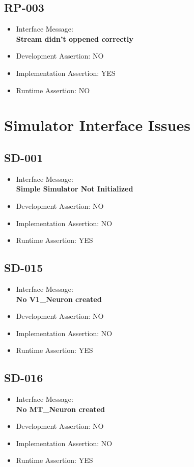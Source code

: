 \subsection{RP-003}
\begin{itemize}
  \item Interface Message:\\[1em]\textbf{Stream didn't oppened correctly}
  \item Development Assertion: NO
  \item Implementation Assertion: YES
  \item Runtime Assertion: NO
\end{itemize}

\section{Simulator Interface Issues}

\subsection{SD-001}
\begin{itemize}
  \item Interface Message:\\[1em]\textbf{Simple Simulator Not Initialized}
  \item Development Assertion: NO
  \item Implementation Assertion: NO
  \item Runtime Assertion: YES
\end{itemize}

\subsection{SD-015}
\begin{itemize}
  \item Interface Message:\\[1em]\textbf{No V1\_Neuron created}
  \item Development Assertion: NO
  \item Implementation Assertion: NO
  \item Runtime Assertion: YES
\end{itemize}

\subsection{SD-016}
\begin{itemize}
  \item Interface Message:\\[1em]\textbf{No MT\_Neuron created}
  \item Development Assertion: NO
  \item Implementation Assertion: NO
  \item Runtime Assertion: YES
\end{itemize}

